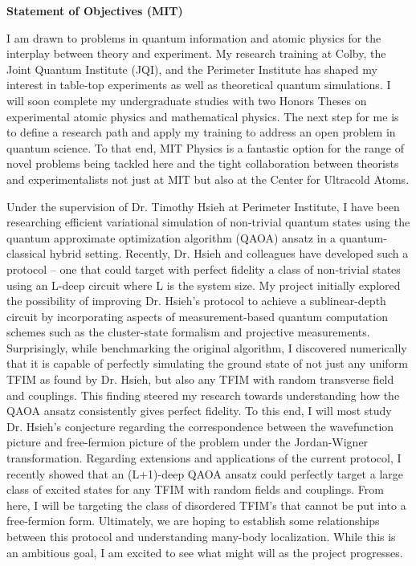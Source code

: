 \documentclass[12pt]{article}
\begin{document}
	
	
\begin{center}
	\textbf{Statement of Objectives (MIT)}
\end{center}\vspace{-5pt}	
I am drawn to problems in quantum information and atomic physics for the interplay between theory and experiment. My research training at Colby, the Joint Quantum Institute (JQI), and the Perimeter Institute has shaped my interest in table-top experiments as well as theoretical quantum simulations. I will soon complete my undergraduate studies with two Honors Theses on experimental atomic physics and mathematical physics. The next step for me is to define a research path and apply my training to address an open problem in quantum science. To that end, MIT Physics is a fantastic option for the range of novel problems being tackled here and the tight collaboration between theorists and experimentalists not just at MIT but also at the Center for Ultracold Atoms.    \\ \vspace{-10pt}

Under the supervision of Dr. Timothy Hsieh at Perimeter Institute, I have been researching efficient variational simulation of non-trivial quantum states using the quantum approximate optimization algorithm (QAOA) ansatz in a quantum-classical hybrid setting. Recently, Dr. Hsieh and colleagues have developed such a protocol -- one that could target with perfect fidelity a class of non-trivial states using an L-deep circuit where L is the system size. My project initially explored the possibility of improving Dr. Hsieh's protocol to achieve a sublinear-depth circuit by incorporating aspects of measurement-based quantum computation schemes such as the cluster-state formalism and projective measurements. Surprisingly, while benchmarking the original algorithm, I discovered numerically that it is capable of perfectly simulating the ground state of not just any uniform TFIM as found by Dr. Hsieh, but also any TFIM with random transverse field and couplings. This finding steered my research towards understanding how the QAOA ansatz consistently gives perfect fidelity. To this end, I will most study Dr. Hsieh's conjecture regarding the correspondence between the wavefunction picture and free-fermion picture of the problem under the Jordan-Wigner transformation. Regarding extensions and applications of the current protocol, I recently showed that an (L+1)-deep QAOA ansatz could perfectly target a large class of excited states for any TFIM with random fields and couplings. From here, I will be targeting the class of disordered TFIM's that cannot be put into a free-fermion form. Ultimately, we are hoping to establish some relationships between this protocol and understanding many-body localization. While this is an ambitious goal, I am excited to see what might will as the project progresses. \\ \vspace{-10pt}
\end{document}
